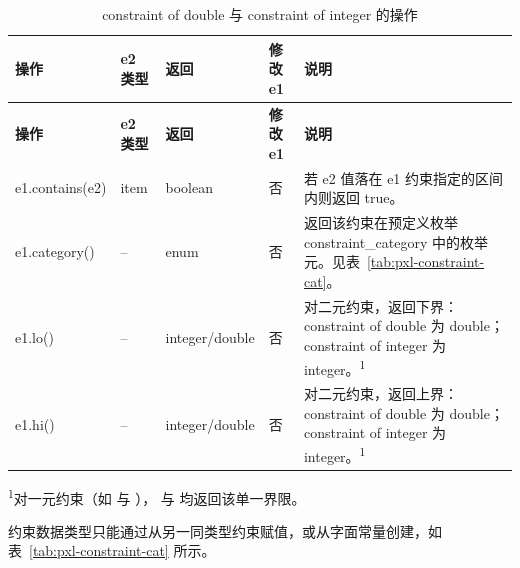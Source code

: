 \begin{longtable}{@{}>{\raggedright\arraybackslash\ttfamily}p{} p{} p{} p{} p{}@{}}
\caption{constraint of double 与 constraint of integer 的操作}\label{tab:pxl-constraint-ops}\\
\toprule
\textbf{\textrm{操作}} & \textbf{\textrm{e2 类型}} & \textbf{\textrm{返回}} & \textbf{\textrm{修改 e1}} & \textbf{\textrm{说明}} \\
\midrule
\endfirsthead
\toprule
\textbf{\textrm{操作}} & \textbf{\textrm{e2 类型}} & \textbf{\textrm{返回}} & \textbf{\textrm{修改 e1}} & \textbf{\textrm{说明}} \\
\midrule
\endhead
\bottomrule
\endfoot
e1.contains(e2) & item & boolean & 否 & 若 e2 值落在 e1 约束指定的区间内则返回 true。 \\
e1.category() & -- & enum & 否 & 返回该约束在预定义枚举 constraint\_category 中的枚举元。见表~\ref{tab:pxl-constraint-cat}。 \\
e1.lo() & -- & integer/double & 否 & 对二元约束，返回下界：constraint of double 为 double；constraint of integer 为 integer。\textsuperscript{1} \\
e1.hi() & -- & integer/double & 否 & 对二元约束，返回上界：constraint of double 为 double；constraint of integer 为 integer。\textsuperscript{1} \\
\end{longtable}

\noindent\small
\textsuperscript{1}对一元约束（如 \cmd{==} 与 \cmd{>}）， 与  均返回该单一界限。

约束数据类型只能通过从另一同类型约束赋值，或从字面常量创建，如表~\ref{tab:pxl-constraint-cat} 所示。

